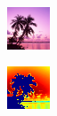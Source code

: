 \begin{figure}
\centering
    \centering
    \begin{subfigure}{0.31\textwidth}
        \includegraphics[width=\textwidth]{figures/RegDream.png}
    \end{subfigure}
    \hspace*{\fill}
    \begin{subfigure}{0.31\textwidth}
        \includegraphics[width=\textwidth]{figures/NegDream.png}

\end{subfigure}
\end{figure}
